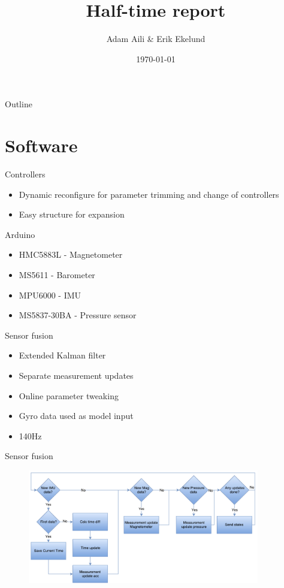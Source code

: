 \documentclass[11pt]{beamer}
\author{Adam Aili \& Erik Ekelund}
\title{Half-time report}
\date{\today}
\begin{document}
\begin{frame}
\titlepage
\end{frame}

\begin{frame}{Outline}
\tableofcontents
\end{frame}
\section{Software}
\begin{frame}{Controllers}
\begin{itemize}
\item Dynamic reconfigure for parameter trimming and change of controllers
\item Easy structure for expansion
\end{itemize}
\end{frame}

\begin{frame}{Arduino}
\begin{itemize}
\item HMC5883L - Magnetometer
\item MS5611 - Barometer
\item MPU6000 - IMU
\item MS5837-30BA - Pressure sensor
\end{itemize}
\end{frame}

\begin{frame}{Sensor fusion}
\begin{itemize}
\item Extended Kalman filter
\item Separate measurement updates
\item Online parameter tweaking
\item Gyro data used as model input
\item 140Hz
\end{itemize}
\end{frame}
\begin{frame}{Sensor fusion}
\begin{figure}
\includegraphics[width=0.9\textwidth]{fig/Fusion.pdf}
\end{figure}
\end{frame}
\end{document}
